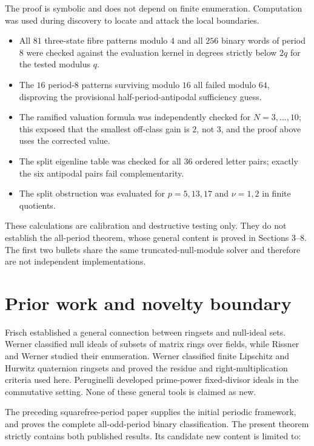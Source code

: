 \documentclass[11pt]{article}
\numberwithin{equation}{section}
\begin{document}
The proof is symbolic and does not depend on finite enumeration. Computation
was used during discovery to locate and attack the local boundaries.

\begin{itemize}
\item All $81$ three-state fibre patterns modulo $4$ and all $256$ binary words
of period $8$ were checked against the evaluation kernel in degrees
strictly below $2q$ for the tested modulus $q$.
\item The $16$ period-$8$ patterns surviving modulo $16$ all failed modulo $64$,
disproving the provisional half-period-antipodal sufficiency guess.
\item The ramified valuation formula was independently checked for
$N=3,\ldots,10$; this exposed that the smallest off-class gain is $2$, not
$3$, and the proof above uses the corrected value.
\item The split eigenline table was checked for all $36$ ordered letter pairs;
exactly the six antipodal pairs fail complementarity.
\item The split obstruction was evaluated for $p=5,13,17$ and
$\nu=1,2$ in finite quotients.

\end{itemize}

These calculations are calibration and destructive testing only. They do
not establish the all-period theorem, whose general content is proved in
Sections 3--8. The first two bullets share the same truncated-null-module
solver and therefore are not independent implementations.

\section{Prior work and novelty boundary}


Frisch \cite{frisch2018} established a general connection between ringsets and null-ideal
sets. Werner \cite{werner2022} classified null ideals of subsets of matrix rings over
fields, while Rissner and Werner \cite{rissnerwerner2025} studied their enumeration. Werner \cite{werner2026}
classified finite Lipschitz and Hurwitz quaternion ringsets and proved the
residue and right-multiplication criteria used here. Peruginelli \cite{peruginelli2014}
developed prime-power fixed-divisor ideals in the commutative setting. None
of these general tools is claimed as new.

The preceding squarefree-period paper \cite{carptopus-squarefree} supplies the initial periodic
framework, and \cite{carptopus-odd} proves the complete all-odd-period binary classification.
The present theorem strictly contains both published results. Its candidate
new content is limited to:
\end{document}
